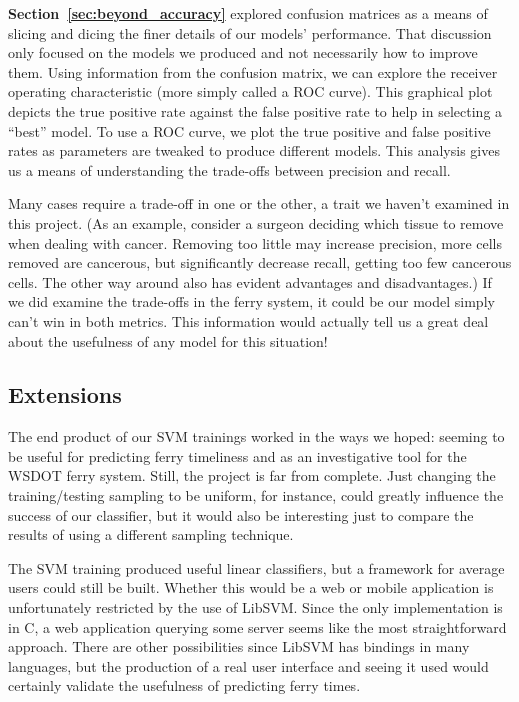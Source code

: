 \documentclass[11pt]{article} %
\begin{document}
\textbf{Section~\ref{sec:beyond_accuracy}} explored confusion matrices as a 
means of slicing and dicing the finer details of our models' performance. That
discussion only focused on the models we produced and not necessarily how to
improve them. Using information from the confusion matrix, we can explore the
receiver operating characteristic (more simply called a ROC curve). This 
graphical plot depicts the true positive rate against the false positive rate
to help in selecting a ``best'' model. To use a ROC curve, we plot the true
positive and false positive rates as parameters are tweaked to produce different
models. This analysis gives us a means of understanding the trade-offs between
precision and recall. 

Many cases require a trade-off in one or the other, a 
trait we haven't examined in this project. (As an example, consider a 
surgeon deciding which tissue to remove when dealing with cancer. Removing too
little may increase precision, more cells removed are cancerous, but significantly
decrease recall, getting too few cancerous cells. The other way around also has
evident advantages and disadvantages.) If we did examine the trade-offs in the
ferry system, it could be our model simply can't win in both metrics. This 
information would actually tell us a great deal about the usefulness of any
model for this situation!

\subsection{Extensions}
\label{sec:extensions}
The end product of our SVM trainings worked in the ways we hoped: seeming to be 
useful for predicting ferry timeliness and as an investigative tool for the
WSDOT ferry system. Still, the project is far from complete. Just changing the
training/testing sampling to be uniform, for instance, could greatly influence
the success of our classifier, but it would also be interesting just to compare
the results of using a different sampling technique.

The SVM training produced useful linear classifiers, but a framework for average
users could still be built. Whether this would be a web or mobile application is
unfortunately restricted by the use of LibSVM. Since the only implementation is in 
C, a web application querying some server seems like the most straightforward
approach. There are other possibilities since LibSVM has bindings in many languages,
but the production of a real user interface and seeing it used would certainly 
validate the usefulness of predicting ferry times.
\end{document}
